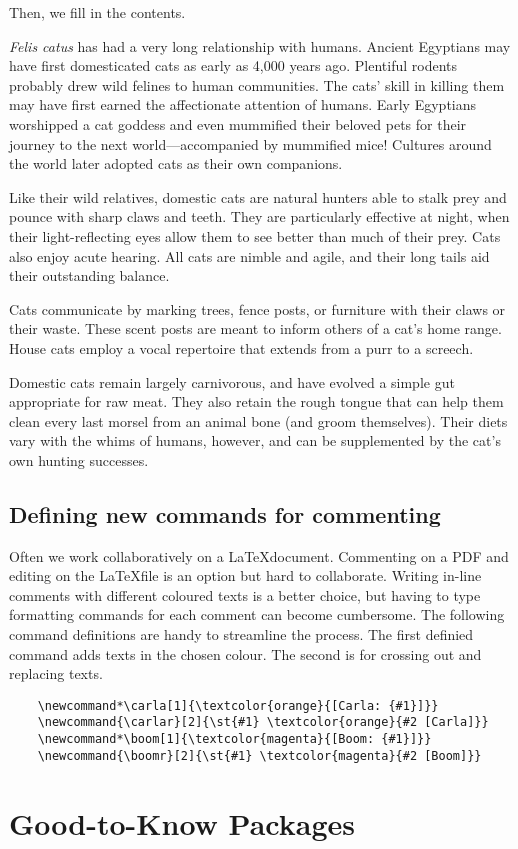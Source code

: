 \documentclass[a4paper,12pt]{article}
\newcommand*\carla[1]{\textcolor{orange}{[Carla: {#1}]}}
\newcommand{\carlar}[2]{\st{#1} \textcolor{orange}{#2 [Carla]}}
\newcommand*\boom[1]{\textcolor{magenta}{[Boom: {#1}]}}
\newcommand{\boomr}[2]{\st{#1} \textcolor{magenta}{#2 [Boom]}}
\begin{document}
Then, we fill in the contents.

\begin{tcolorbox}[parbox=false]
\emph{Felis catus} has had a very long relationship with humans. Ancient Egyptians may have first domesticated cats as early as 4,000 years ago. Plentiful rodents probably drew wild felines to human communities. The cats' skill in killing them may have first earned the affectionate attention of humans. Early Egyptians worshipped a cat goddess and even mummified their beloved pets for their journey to the next world—accompanied by mummified mice! Cultures around the world later adopted cats as their own companions.

Like their wild relatives, domestic cats are natural hunters able to stalk prey and pounce with sharp claws and teeth. They are particularly effective at night, when their light-reflecting eyes allow them to see better than much of their prey. Cats also enjoy acute hearing. All cats are nimble and agile, and their long tails aid their outstanding balance. \par


Cats communicate by marking trees, fence posts, or furniture with their claws or their waste. These scent posts are meant to inform others of a cat's home range. House cats employ a vocal repertoire that extends from a purr to a screech.


Domestic cats remain largely carnivorous, and have evolved a simple gut appropriate for raw meat. They also retain the rough tongue that can help them clean every last morsel from an animal bone (and groom themselves). Their diets vary with the whims of humans, however, and can be supplemented by the cat's own hunting successes.
\end{tcolorbox}

\subsection{Defining new commands for commenting}
Often we work collaboratively on a \LaTeX document. Commenting on a PDF and editing on the \LaTeX file is an option but hard to collaborate. Writing in-line comments with different coloured texts is a better choice, but having to type formatting commands for each comment can become cumbersome. The following command definitions are handy to streamline the process. The first definied command adds texts in the chosen colour. The second is for crossing out and replacing texts.
\begin{tcolorbox}
\begin{verbatim}
    \newcommand*\carla[1]{\textcolor{orange}{[Carla: {#1}]}}
    \newcommand{\carlar}[2]{\st{#1} \textcolor{orange}{#2 [Carla]}}
    \newcommand*\boom[1]{\textcolor{magenta}{[Boom: {#1}]}}
    \newcommand{\boomr}[2]{\st{#1} \textcolor{magenta}{#2 [Boom]}}
\end{verbatim}
\end{tcolorbox}



\section{Good-to-Know Packages}
\end{document}
